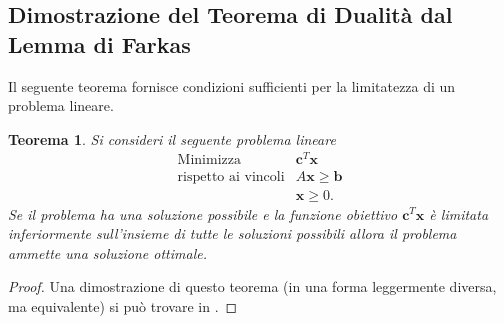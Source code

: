 \documentclass[italian, 12pt, reqno]{article}
\theoremstyle{myteo}
\newtheorem{theorem}{Teorema}[section]
\numberwithin{equation}{section}
\begin{document}
\subsection{Dimostrazione del Teorema di Dualità dal Lemma di Farkas}
\label{subsec:dim_dualità}

Il seguente teorema fornisce condizioni sufficienti per la limitatezza di un problema lineare.

\begin{theorem}
  \label{teo:condizioni_sufficienti}
  Si consideri il seguente problema lineare
  \begin{equation*}
    \begin{array}{ll}
      \text{Minimizza} & \mathbf{c}^T\mathbf{x}\\
      \text{rispetto ai vincoli} & A\mathbf{x} \ge \mathbf{b}\\
                        & \mathbf{x} \ge 0.
    \end{array}
  \end{equation*}
  Se il problema ha una soluzione possibile e la funzione obiettivo \(\mathbf{c}^T\mathbf{x}\) è limitata \emph{inferiormente} sull'insieme di tutte le soluzioni possibili allora il problema ammette una soluzione ottimale.
\end{theorem}

\begin{proof}
  Una dimostrazione di questo teorema (in una forma leggermente diversa, ma equivalente) si può trovare in \cite[Theorem 4.2.3]{understanding_linear_programming}.
\end{proof}
\end{document}
